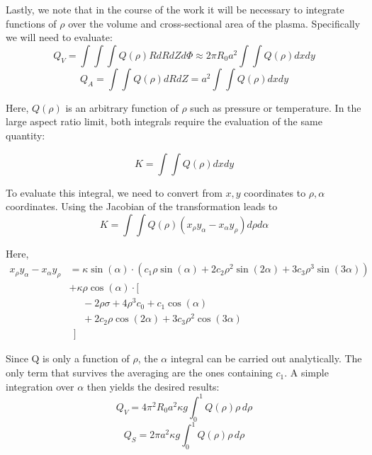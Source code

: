 Lastly, we note that in the course of the work it will be necessary to integrate functions of $\rho$ over the volume and cross-sectional area of the plasma. Specifically we will need to evaluate:
\begin{equation}
	Q_V = \int \int \int Q(\rho) R dR dZ d\Phi \approx 2 \pi R_0 a^2 \int \int Q(\rho) dx dy
\end{equation}
\begin{equation}
	Q_A = \int \int Q(\rho) dR dZ = a^2 \int \int Q(\rho) dx dy
\end{equation}

Here, $Q(\rho)$ is an arbitrary function of $\rho$ such as pressure or temperature. In the large aspect ratio limit, both integrals require the evaluation of the same quantity:

\begin{equation}
	K = \int \int Q(\rho) dx dy
\end{equation}

To evaluate this integral, we need to convert from $x, y$ coordinates to $\rho, \alpha$ coordinates. Using the Jacobian of the transformation leads to
\begin{equation}
	K = \int \int Q(\rho) (x_\rho y_\alpha - x_\alpha y_\rho ) d\rho d\alpha
\end{equation}

Here,
\begin{equation}
\begin{split}
	x_\rho y_\alpha - x_\alpha y_\rho & = \kappa \sin(\alpha) \cdot \left( c_1 \rho \sin(\alpha) + 2 c_2 \rho^2 \sin(2\alpha)  + 3 c_3 \rho^3 \sin(3\alpha)  \right) \\
		& + \kappa \rho \cos(\alpha) \cdot \Big[ \\
		& \ \ \ \ \ \ -2 \rho \sigma + 4 \rho^3 c_0 + c_1 \cos(\alpha) \\
		& \ \ \ \ \ \ + 2 c_2 \rho \cos(2\alpha) + 3 c_3 \rho^2 \cos(3\alpha) \\
		& \ \ \Big]
\end{split}
\end{equation}

Since Q is only a function of $\rho$, the $\alpha$ integral can be carried out analytically. The only term that survives the averaging are the ones containing $c_1$. A simple integration over $\alpha$ then yields the desired results:
\begin{equation}
  	\label{eq:qv}
 	Q_V = 4 \pi^2 R_0 a^2 \kappa g \int_0^1 Q(\rho) \rho \, d\rho
\end{equation}
\begin{equation}
	\label{eq:qs}
	Q_S = 2 \pi a^2 \kappa g \int_0^1 Q(\rho) \rho \, d\rho
\end{equation}

